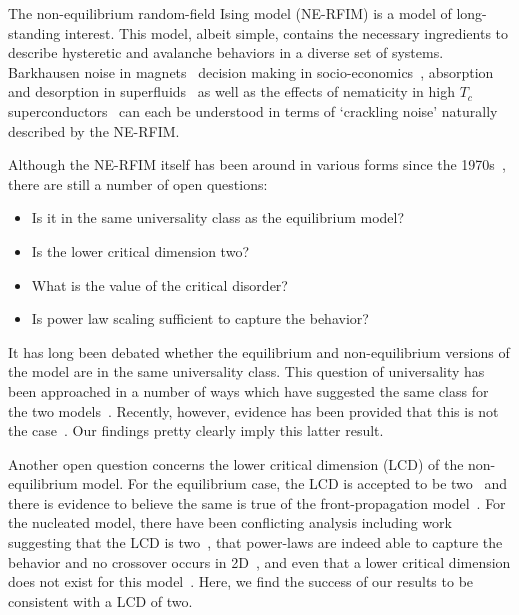 \documentclass[reprint,amsmath,amssymb,aps,floatfix]{revtex4-1}
\begin{document}
The non-equilibrium random-field Ising model (NE-RFIM) is a model of long-standing interest. This model, albeit simple, contains the necessary ingredients to describe hysteretic and avalanche behaviors in a diverse set of systems. Barkhausen noise in magnets~\cite{Bertotti98} decision making in socio-economics~\cite{Bouchaud13}, absorption and desorption in superfluids~\cite{Lilly96, Detcheverry04} as well as the effects of nematicity in high $T_c$ superconductors~\cite{Bonetti04, Carlson06, Phillabaum2012} can each be understood in terms of `crackling noise' naturally described by the NE-RFIM. \par
%
Although the NE-RFIM itself has been around in various forms since the 1970s~\cite{ImryMa75}, there are still a number of open questions:
%
\begin{itemize}
	\item Is it in the same universality class as the equilibrium model?
	\item Is the lower critical dimension two?
	\item What is the value of the critical disorder?
	\item Is power law scaling sufficient to capture the behavior?
\end{itemize}
%
It has long been debated whether the equilibrium and non-equilibrium versions of the model are in the same universality class. This question of universality has been approached in a number of ways which have suggested the same class for the two models~\cite{Maritan94, Perez-Reche04, Colaiori04, LiuDahmen09, LiuDahmen09-2,BalogTissierTarjus14}. Recently, however, evidence has been provided that this is not the case~\cite{BalogTarjusTissier18}. Our findings pretty clearly imply this latter result. \par
%
Another open question concerns the lower critical dimension (LCD) of the non-equilibrium model. For the equilibrium case, the LCD is accepted to be two~\cite{BrayMoore85} and there is evidence to believe the same is true of the front-propagation model~\cite{Drossel98}. For the nucleated model, there have been conflicting analysis including work suggesting that the LCD is two~\cite{Perkovic95,Perkovic96}, that power-laws are indeed able to capture the behavior and no crossover occurs in 2D~\cite{Spasojevic11, Spasojevic11-2}, and even that a lower critical dimension does not exist for this model~\cite{Thongjaomayum13,Kurbah15,Shukla16,Shukla17}. Here, we find the success of our results to be consistent with a LCD of two. \par
\end{document}
